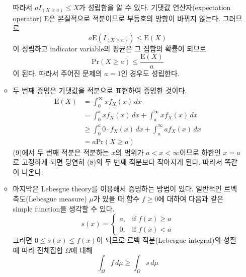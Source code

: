 \documentclass[answers]{exam}
\begin{document}
\begin{questions}
\begin{solution}
\begin{enumerate}[(a)]
\begin{itemize}
\begin{equation}
          \end{equation}
          따라서 $aI_{\left(X\geq a\right)}\leq X$가 성립함을 알 수 있다. 기댓값 연산자(expectation operator) $\mathrm{E}$은 본질적으로 적분이므로 부등호의 방향이 바뀌지 않는다. 그러므로
          \begin{equation}
            a\mathrm{E}\left(I_{\left(X\geq a\right)}\right) \leq \mathrm{E}\left(X\right)
          \end{equation}
          이 성립하고 indicator variable의 평균은 그 집합의 확률이 되므로
          \begin{equation}
            \mathrm{Pr}\left(X\geq a\right) \leq \dfrac{\mathrm{E}\left(X\right)}{a}
          \end{equation}
          이 된다. 따라서 주어진 문제의 $a=1$인 경우도 성립한다.
          \item 두 번째 증명은 기댓값을 적분으로 표현하여 증명한 것이다.
          \begin{align}
            \mathrm{E}\left(X\right) &= \int_{0}^{\infty}xf_{X}\left(x\right)\,dx\\
            &= \int_{0}^{a}xf_{X}\left(x\right)\,dx + \int_{a}^{\infty}xf_{X}\left(x\right)\,dx\\
            &\geq \int_{0}^{a} 0\cdot f_{X}\left(x\right)\,dx + \int_{a}^{\infty} af_{X}\left(x\right)\,dx\\
            &= a\mathrm{Pr}\left(X\geq a\right)
          \end{align}
          (9)에서 두 번째 적분은 적분하는 $x$의 범위가 $a<x<\infty$이므로 하한인 $x=a$로 고정하게 되면 당연히 (8)의 두 번째 적분보다 작아지게 된다. 따라서 똑같이 나온다.
          \item 마지막은 Lebesgue theory를 이용해서 증명하는 방법이 있다. 일반적인 르벡 측도(Lebesgue measure) $\mu$가 있을 때 함수 $f\geq 0$에 대하여 다음과 같은 simple function을 생각할 수 있다.
          \begin{equation}
            s\left(x\right)=\begin{cases}a, & \text{if $f\left(x\right)\geq a$}\\ 0, & \text{if $f\left(x\right)< a$}\end{cases}
          \end{equation}
          그러면 $0\leq s\left(x\right)\leq f\left(x\right)$이 되므로 르벡 적분(Lebesgue integral)의 성질에 따라 전체집합 $\Omega$에 대해
          \begin{equation}
            \int_{\Omega}f\,d\mu \geq \int_{\Omega}s\, d\mu
          \end{equation}

\end{itemize}
\end{enumerate}
\end{solution}
\end{questions}
\end{document}
